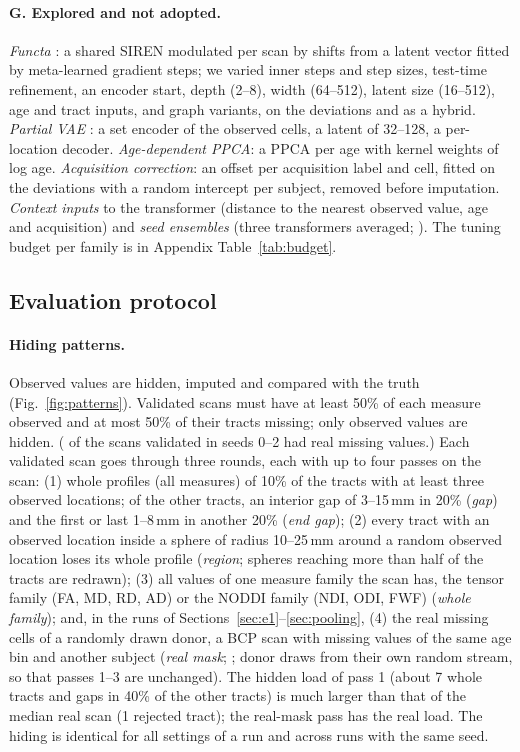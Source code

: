 \documentclass[11pt]{article}
\begin{document}
\paragraph{G. Explored and not adopted.} \emph{Functa} \citep{dupont2022functa,friedrich2025medfuncta}: a shared SIREN
modulated per scan by shifts from a latent vector fitted by meta-learned gradient steps; we varied inner steps and step
sizes, test-time refinement, an encoder start, depth (2--8), width (64--512), latent size (16--512), age and tract
inputs, and graph variants, on the deviations and as a hybrid. \emph{Partial VAE} \citep{ma2019eddi,mattei2019miwae}: a
set encoder of the observed cells, a latent of 32--128, a per-location decoder. \emph{Age-dependent PPCA}: a PPCA per
age with kernel weights of log age. \emph{Acquisition correction}: an offset per acquisition label and cell, fitted on
the deviations with a random intercept per subject, removed before imputation. \emph{Context inputs} to the
transformer (distance to the nearest observed value, age and acquisition) and \emph{seed ensembles} (three
transformers averaged; \citealp{lakshminarayanan2017ensembles}). The tuning budget per family is in Appendix
Table~\ref{tab:budget}.

\subsection{Evaluation protocol}\label{sec:protocol}

\paragraph{Hiding patterns.} Observed values are hidden, imputed and compared with the truth (Fig.~\ref{fig:patterns}).
Validated scans must have at least 50\% of each measure observed and at most 50\% of their tracts missing; only observed
values are hidden. (\nValidatedWithMissing{} of the \nScansDistinct{} scans validated in seeds 0--2 had real missing values.) Each validated scan goes through three rounds, each with up to four passes on the scan:
(1) whole profiles (all measures) of 10\% of the tracts with at least three observed locations; of the other tracts, an
interior gap of 3--15\,mm in 20\% (\emph{gap}) and the first or last 1--8\,mm in another 20\% (\emph{end gap}); (2) every
tract with an observed location inside a sphere of radius 10--25\,mm around a random observed location loses its whole
profile (\emph{region}; spheres reaching more than half of the tracts are redrawn); (3) all values of one measure family
the scan has, the tensor family (FA, MD, RD, AD) or the NODDI family (NDI, ODI, FWF) (\emph{whole family}); and, in the
runs of Sections~\ref{sec:e1}--\ref{sec:pooling}, (4) the real missing cells of a randomly drawn donor, a BCP scan with
missing values of the same age bin and another subject (\emph{real mask}; ; donor draws
from their own random stream, so that passes 1--3 are unchanged). The hidden load of pass 1 (about 7 whole tracts and
gaps in 40\% of the other tracts) is much larger than that of the median real scan (1 rejected tract); the real-mask pass
has the real load. The hiding is identical for all settings of a run and across runs with the same seed.
\end{document}
